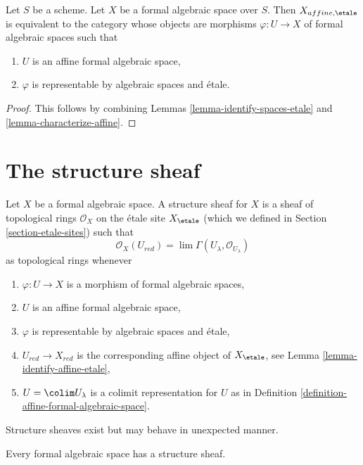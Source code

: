 \begin{lemma}
\label{lemma-identify-affine-etale}
Let $S$ be a scheme. Let $X$ be a formal algebraic space over $S$.
Then $X_{affine, \etale}$ is equivalent to the category whose objects
are morphisms $\varphi : U \to X$ of formal algebraic spaces such that
\begin{enumerate}
\item $U$ is an affine formal algebraic space,
\item $\varphi$ is representable by algebraic spaces and \'etale.
\end{enumerate}
\end{lemma}

\begin{proof}
This follows by combining Lemmas \ref{lemma-identify-spaces-etale} and
\ref{lemma-characterize-affine}.
\end{proof}






\section{The structure sheaf}
\label{section-structure-sheaf}

\noindent
Let $X$ be a formal algebraic space. A structure sheaf for $X$
is a sheaf of topological rings $\mathcal{O}_X$ on the \'etale site
$X_\etale$ (which we defined in Section \ref{section-etale-sites}) such that
$$
\mathcal{O}_X(U_{red}) = \lim \Gamma(U_\lambda, \mathcal{O}_{U_\lambda})
$$
as topological rings whenever
\begin{enumerate}
\item $\varphi : U \to X$ is a morphism of formal algebraic spaces,
\item $U$ is an affine formal algebraic space,
\item $\varphi$ is representable by algebraic spaces and \'etale,
\item $U_{red} \to X_{red}$ is the corresponding affine object of
$X_\etale$, see
Lemma \ref{lemma-identify-affine-etale},
\item $U = \colim U_\lambda$ is a colimit representation for $U$ as in
Definition \ref{definition-affine-formal-algebraic-space}.
\end{enumerate}
Structure sheaves exist but may behave in unexpected manner.

\begin{lemma}
\label{lemma-structure-sheaf}
Every formal algebraic space has a structure sheaf.
\end{lemma}

